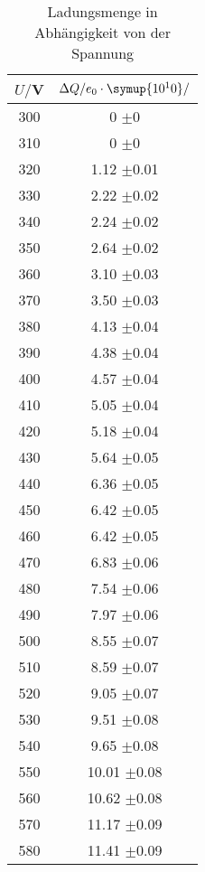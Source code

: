 \begin{table}[H]
  \centering
  \caption{Ladungsmenge in Abhängigkeit von der Spannung}
  \label{tab:Rechteckspannung}
  \begin{tabular}{c c}
    \toprule
    $U/$V & $\Delta Q/e_0 \cdot \symup{10^10}/$ \\
    \midrule
      300 &                  0   $\pm 0$ \\
      310 &                  0   $\pm 0$ \\
      320 &        1.12    $\pm$0.01 \\
      330 &        2.22    $\pm$0.02 \\
      340 &        2.24    $\pm$0.02 \\
      350 &        2.64    $\pm$0.02 \\
      360 &        3.10    $\pm$0.03 \\
      370 &        3.50    $\pm$0.03 \\
      380 &        4.13    $\pm$0.04 \\
      390 &        4.38    $\pm$0.04 \\
      400 &        4.57    $\pm$0.04 \\
      410 &        5.05    $\pm$0.04 \\
      420 &        5.18    $\pm$0.04 \\
      430 &        5.64    $\pm$0.05 \\
      440 &        6.36    $\pm$0.05 \\
      450 &        6.42    $\pm$0.05 \\
      460 &        6.42    $\pm$0.05 \\
      470 &        6.83    $\pm$0.06 \\
      480 &        7.54    $\pm$0.06 \\
      490 &        7.97    $\pm$0.06 \\
      500 &        8.55    $\pm$0.07 \\
      510 &        8.59    $\pm$0.07 \\
      520 &        9.05    $\pm$0.07 \\
      530 &        9.51    $\pm$0.08 \\
      540 &        9.65    $\pm$0.08 \\
      550 &        10.01   $\pm$0.08 \\
      560 &        10.62   $\pm$0.08 \\
      570 &        11.17   $\pm$0.09 \\
      580 &        11.41   $\pm$0.09 \\

\end{tabular}
\end{table}
